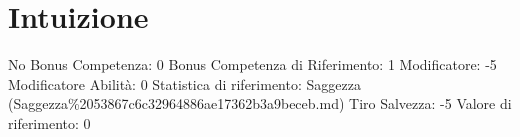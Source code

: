 \section{Intuizione}\label{intuizione}

\begin{description}
\tightlist
\item[Tags: ABI]
No Bonus Competenza: 0 Bonus Competenza di Riferimento: 1 Modificatore:
-5 Modificatore Abilità: 0 Statistica di riferimento: Saggezza
(Saggezza\%2053867c6c32964886ae17362b3a9beceb.md) Tiro Salvezza: -5
Valore di riferimento: 0
\end{description}
